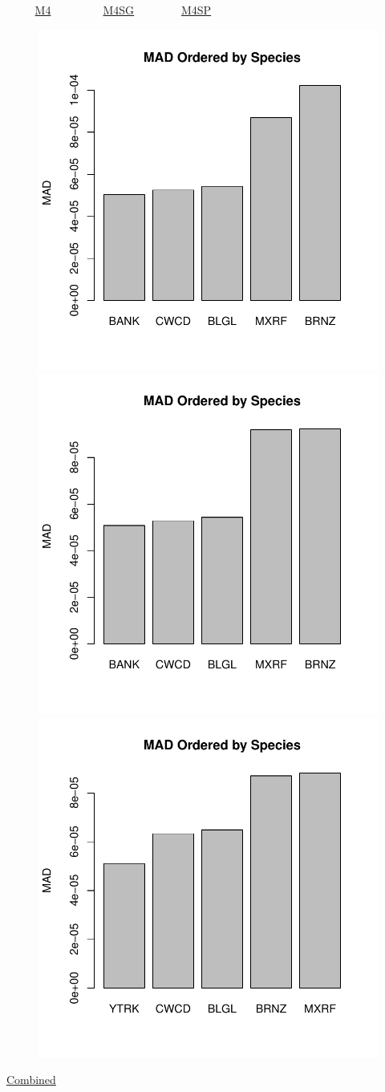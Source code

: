 \documentclass[ xcolor = pdftex, dvipsnames, table ]{beamer}
\begin{document}
\begin{frame}{$~~~~~~~~~~$ \href{https://github.com/gasduster99/sppComp/tree/master/sscRuns/25019781982M4}{M4} $~~~~~~~~~~~~~~~~~~$ \href{https://github.com/gasduster99/sppComp/tree/master/sscRuns/25019781982M4IGSG}{M4SG} $~~~~~~~~~~~~~~~~$ \href{https://github.com/gasduster99/sppComp/tree/master/sscRuns/25019781982M4IGSP}{M4SP} }
        \begin{figure}[ht!]
        \centering
        \hspace*{-1cm}
        \includegraphics[width=.4\textwidth]{../sscRuns/25019781982M4/sppTailMad68.pdf}
        \includegraphics[width=.4\textwidth]{../sscRuns/25019781982M4IGSG/sppTailMad68.pdf}
        \includegraphics[width=.4\textwidth]{../sscRuns/25019781982M4IGSP/sppTailMad68.pdf}
        \end{figure}
	\vspace{-1cm}
	\begin{center}
	\Large
	\href{https://github.com/gasduster99/sppComp/tree/master/try1/postSSC/25019781982M4IGSPSG}{Combined}
	\end{center}
\end{frame}
\end{document}
